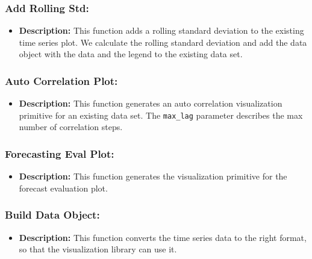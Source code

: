 \documentclass[11pt, a4paper]{article}
\begin{document}
\subsubsection*{Add Rolling Std:}
\begin{itemize}
 \item[] \textbf{Description:} This function adds a rolling standard deviation to the existing time series plot. 
 We calculate the rolling standard deviation and add the data object with the data and the legend to the existing data set.
\end{itemize}


\subsubsection*{Auto Correlation Plot:}
\begin{itemize}
 \item[] \textbf{Description:} This function generates an auto correlation visualization primitive for an existing data set. The \texttt{max\_lag} parameter 
 describes the max number of correlation steps.
\end{itemize}


\subsubsection*{Forecasting Eval Plot:}
\begin{itemize}
 \item[] \textbf{Description:} This function generates the visualization primitive for the forecast evaluation plot.
\end{itemize}


\subsubsection*{Build Data Object:}
\begin{itemize}
 \item[] \textbf{Description:} This function converts the time series data to the right format, so that the visualization library can use it.
\end{itemize}
\end{document}

